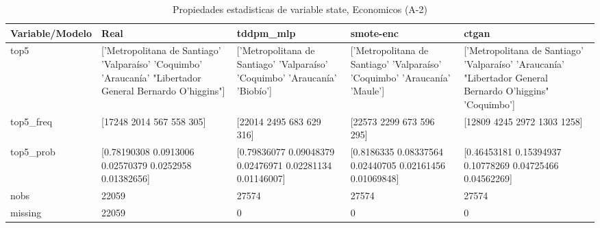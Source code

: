 \begin{table}[H]
\centering
\fontsize{8}{14}\selectfont
\caption{Propiedades  estadisticas de variable state, Economicos (A-2)}
\label{table-stats-economicos-a-2-state}
\begin{tabular}{|l|m{10em}|m{10em}|m{10em}|m{10em}|}
\hline
 \rowcolor[gray]{0.8}
Variable/Modelo & Real & tddpm\_mlp & smote-enc & ctgan \\
\hline top5 & ['Metropolitana de Santiago' 'Valparaíso' 'Coquimbo' 'Araucanía'
 "Libertador General Bernardo O'higgins"] & ['Metropolitana de Santiago' 'Valparaíso' 'Coquimbo' 'Araucanía' 'Biobío'] & ['Metropolitana de Santiago' 'Valparaíso' 'Coquimbo' 'Araucanía' 'Maule'] & ['Metropolitana de Santiago' 'Valparaíso' 'Araucanía'
 "Libertador General Bernardo O'higgins" 'Coquimbo'] \\
\hline top5\_freq & [17248  2014   567   558   305] & [22014  2495   683   629   316] & [22573  2299   673   596   295] & [12809  4245  2972  1303  1258] \\
\hline top5\_prob & [0.78190308 0.0913006  0.02570379 0.0252958  0.01382656] & [0.79836077 0.09048379 0.02476971 0.02281134 0.01146007] & [0.8186335  0.08337564 0.02440705 0.02161456 0.01069848] & [0.46453181 0.15394937 0.10778269 0.04725466 0.04562269] \\
\hline nobs & 22059 & 27574 & 27574 & 27574 \\
\hline missing & 22059 & 0 & 0 & 0 \\
\hline
\end{tabular}
\end{table}
